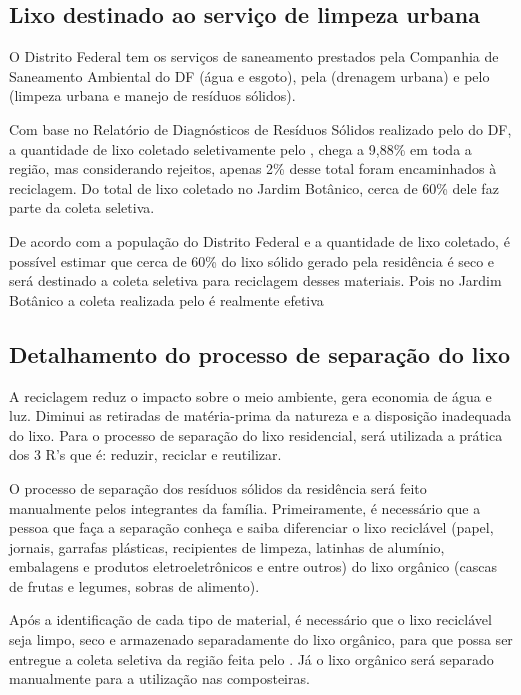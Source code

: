 \subsection{Lixo destinado ao serviço de limpeza urbana}

	O Distrito Federal tem os serviços de saneamento prestados pela Companhia de Saneamento Ambiental do DF\cite{CAESB} (água e esgoto), pela \cite{Novacap} (drenagem urbana) e pelo \cite{SLU} (limpeza urbana e manejo de resíduos sólidos).

	Com base no Relatório de Diagnósticos de Resíduos Sólidos realizado pelo \cite{SLU} do DF, a quantidade de lixo coletado seletivamente pelo \cite{SLU}, chega a 9,88\% em toda a região, mas considerando rejeitos, apenas 2\% desse total foram encaminhados à reciclagem. Do total de lixo coletado no Jardim Botânico, cerca de 60\% dele faz parte da coleta seletiva.

	De acordo com a população do Distrito Federal e a quantidade de lixo coletado, é possível estimar que cerca de 60\% do lixo sólido gerado pela residência é seco e será destinado a coleta seletiva para reciclagem desses materiais. Pois no Jardim Botânico a coleta realizada pelo \cite{SLU} é realmente efetiva

\subsection{Detalhamento do processo de separação do lixo}

	A reciclagem reduz o impacto sobre o meio ambiente, gera economia de água e luz. Diminui as retiradas de matéria-prima da natureza e a disposição inadequada do lixo. Para o processo de separação do lixo residencial, será utilizada a prática dos 3 R's que é: reduzir, reciclar e reutilizar.

	O processo de separação dos resíduos sólidos da residência será feito manualmente pelos integrantes da família. Primeiramente, é necessário que a pessoa que faça a separação conheça e saiba diferenciar o lixo reciclável (papel, jornais, garrafas plásticas, recipientes de limpeza, latinhas de alumínio, embalagens e produtos eletroeletrônicos e entre outros) do lixo orgânico (cascas de frutas e legumes, sobras de alimento).

	Após a identificação de cada tipo de material, é necessário que o lixo reciclável seja limpo, seco e armazenado separadamente do lixo orgânico, para que possa ser entregue a coleta seletiva da região feita pelo \cite{SLU}. Já o lixo orgânico será separado manualmente para a utilização nas composteiras.

